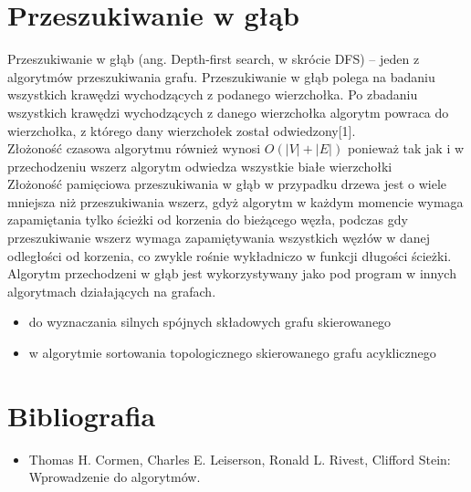 \documentclass[10pt,oneside]{mwbk}
\begin{document}
\section {Przeszukiwanie w głąb}
Przeszukiwanie w głąb (ang. Depth-first search, w skrócie DFS) – jeden z algorytmów przeszukiwania grafu. Przeszukiwanie w głąb polega na badaniu wszystkich krawędzi wychodzących z podanego wierzchołka. Po zbadaniu wszystkich krawędzi wychodzących z danego wierzchołka algorytm powraca do wierzchołka, z którego dany wierzchołek został odwiedzony[1].\\
\indent Złożoność czasowa algorytmu również wynosi $O(|V|+|E|)$ ponieważ tak jak i w przechodzeniu wszerz algorytm odwiedza wszystkie białe wierzchołki \\
\indent Złożoność pamięciowa przeszukiwania w głąb w przypadku drzewa jest o wiele mniejsza niż przeszukiwania wszerz, gdyż algorytm w każdym momencie wymaga zapamiętania tylko ścieżki od korzenia do bieżącego węzła, podczas gdy przeszukiwanie wszerz wymaga zapamiętywania wszystkich węzłów w danej odległości od korzenia, co zwykle rośnie wykładniczo w funkcji długości ścieżki.\\
\indent Algorytm przechodzeni w głąb jest wykorzystywany jako pod program w innych algorytmach działających na grafach.
\begin{itemize}
\item do wyznaczania silnych spójnych składowych grafu skierowanego
\item w algorytmie sortowania topologicznego skierowanego grafu acyklicznego
\end{itemize}
\section{Bibliografia}
\begin{itemize}
\item Thomas H. Cormen, Charles E. Leiserson, Ronald L. Rivest, Clifford Stein: Wprowadzenie do algorytmów.

\end{itemize}

 
\end{document}
